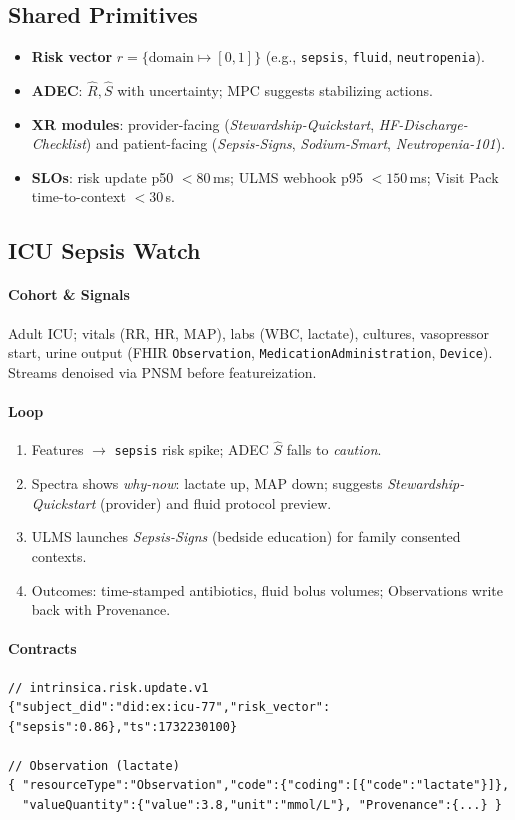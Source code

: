 \documentclass[11pt]{article}
\theoremstyle{plain}
\begin{document}
\subsection{Shared Primitives}
\begin{itemize}
  \item \textbf{Risk vector} $r=\{\text{domain}\mapsto[0,1]\}$ (e.g., \texttt{sepsis}, \texttt{fluid}, \texttt{neutropenia}).
  \item \textbf{ADEC}: $\hat R,\hat S$ with uncertainty; MPC suggests stabilizing actions.
  \item \textbf{XR modules}: provider-facing (\textit{Stewardship-Quickstart}, \textit{HF-Discharge-Checklist}) and patient-facing (\textit{Sepsis-Signs}, \textit{Sodium-Smart}, \textit{Neutropenia-101}).
  \item \textbf{SLOs}: risk update p50 $<80$\,ms; ULMS webhook p95 $<150$\,ms; Visit Pack time-to-context $<30$\,s.
\end{itemize}

\subsection{ICU Sepsis Watch}
\paragraph{Cohort \& Signals}
Adult ICU; vitals (RR, HR, MAP), labs (WBC, lactate), cultures, vasopressor start, urine output (FHIR \texttt{Observation}, \texttt{MedicationAdministration}, \texttt{Device}). Streams denoised via PNSM before featureization.
\paragraph{Loop}
\begin{enumerate}
  \item Features $\rightarrow$ \texttt{sepsis} risk spike; ADEC $\hat S$ falls to \textit{caution}.
  \item Spectra shows \emph{why-now}: lactate up, MAP down; suggests \textit{Stewardship-Quickstart} (provider) and fluid protocol preview.
  \item ULMS launches \textit{Sepsis-Signs} (bedside education) for family consented contexts.
  \item Outcomes: time-stamped antibiotics, fluid bolus volumes; Observations write back with Provenance.
\end{enumerate}
\paragraph{Contracts}
\begin{verbatim}
// intrinsica.risk.update.v1
{"subject_did":"did:ex:icu-77","risk_vector":{"sepsis":0.86},"ts":1732230100}

// Observation (lactate)
{ "resourceType":"Observation","code":{"coding":[{"code":"lactate"}]},
  "valueQuantity":{"value":3.8,"unit":"mmol/L"}, "Provenance":{...} }
\end{verbatim}
\end{document}
